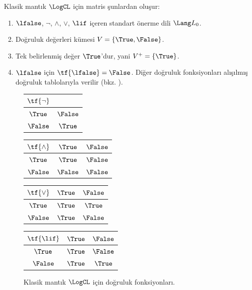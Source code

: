 \begin{ex}
Klasik mantık $\LogCL$ için matris şunlardan oluşur:
\begin{enumerate}
  \item $\lfalse$, $\lnot$, $\land$, $\lor$, $\lif$ içeren standart
  önerme dili $\Lang L_0$.
  \item Doğruluk değerleri kümesi $V=\{\True,\False\}$.
  \item Tek belirlenmiş değer $\True$'dur, yani $V^+=\{\True\}$.
  \item $\lfalse$ için $\tf{\lfalse}=\False$. Diğer doğruluk fonksiyonları
  alışılmış doğruluk tablolarıyla verilir (bkz. ).
\end{enumerate}
\begin{figure}
  \begin{center}
      \begin{tabular}{c|c} 
        $\tf{\lnot}$ & \\ 
        \hline  
        $\True$ & $\False$ \\ 
        $\False$ & $\True$ 
      \end{tabular}
      \quad
      \begin{tabular}{c|cc} 
        $\tf{\land}$ & $\True$ & $\False$ \\ 
        \hline 
        $\True$ & $\True$ & $\False$ \\ 
        $\False$ & $\False$ & $\False$ 
      \end{tabular}
      \quad
      \begin{tabular}{c|cc} 
        $\tf{\lor}$ & $\True$ & $\False$ \\ 
        \hline 
        $\True$ & $\True$ & $\True$ \\ 
        $\False$ & $\True$ & $\False$ 
      \end{tabular}
      \quad
      \begin{tabular}{c|cc} 
        $\tf{\lif}$ & $\True$ & $\False$ \\ 
        \hline 
        $\True$ & $\True$ & $\False$ \\ 
        $\False$ & $\True$ & $\True$ 
      \end{tabular}
    \end{center} 
    \caption{Klasik mantık $\LogCL$ için doğruluk fonksiyonları.}
  \end{figure}
  \end{ex}

